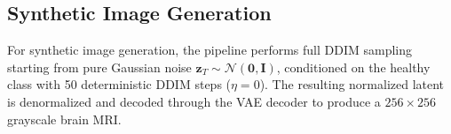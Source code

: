 \subsection{Synthetic Image Generation}
\label{sec:generation}

For synthetic image generation, the pipeline performs full DDIM sampling starting from pure Gaussian noise $\mathbf{z}_T \sim \mathcal{N}(\mathbf{0}, \mathbf{I})$, conditioned on the healthy class with 50 deterministic DDIM steps ($\eta = 0$). The resulting normalized latent is denormalized and decoded through the VAE decoder to produce a $256 \times 256$ grayscale brain MRI.
